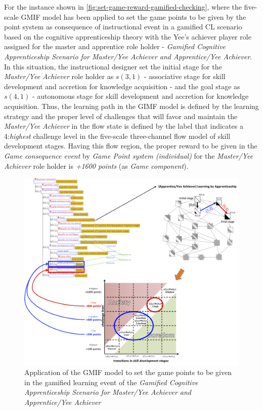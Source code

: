 For the instance shown in \autoref{fig:set-game-reward-gamified-checking}, where the five-scale GMIF model has been applied to set the game points to be given by the point system as consequence of instructional event  in a gamified CL scenario based on the cognitive apprenticeship theory with the Yee's achiever player role assigned for the master and apprentice role holder - \emph{Gamified Cognitive Apprenticeship Scenario for Master/Yee Achiever and Apprentice/Yee Achiever}.
In this situation, the instructional designer set the initial stage for the \emph{Master/Yee Achiever} role holder as $s(3,1)$ - associative stage for skill development and accretion for knowledge acquisition - and the goal stage as $s(4,1)$ - autonomous stage for skill development and accretion for knowledge acquisition.
Thus, the learning path in the GIMF model is defined by the learning strategy  and the proper level of challenges that will favor and maintain the \emph{Master/Yee Achiever} in the flow state is defined  by the label\aspas{$[4;4]$} that indicates a 4:\emph{highest} challenge level in the five-scale three-channel flow model of skill development stages.
Having this flow region, the proper reward to be given in the \emph{Game consequence event} by \emph{Game Point system (individual)} for the \emph{Master/Yee Achiever} role holder is \emph{+1600 points} (as \emph{Game component}).

\begin{figure}[htb]
 \caption{Application of the GMIF model to set the game points to be given in the gamified learning event  of the \emph{Gamified Cognitive Apprenticeship Scenario for Master/Yee Achiever and Apprentice/Yee Achiever}}
 \label{fig:set-game-reward-gamified-being-checked}
 \centering
 \includegraphics[width=1\textwidth]{images/chap-model-gmif/set-game-reward-gamified-being-checked.png}
 \fautor
\end{figure}

